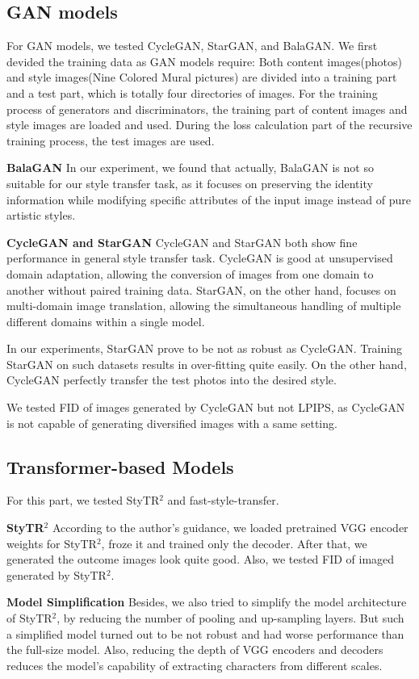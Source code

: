 \documentclass[conference]{IEEEtran}
\begin{document}
\subsection{GAN models}
For GAN models, we tested CycleGAN, StarGAN, and BalaGAN. We first devided the training data as GAN models require: Both content images(photos) and style images(Nine Colored Mural pictures) are divided into a training part and a test part, which is totally four directories of images. For the training process of generators and discriminators, the training part of content images and style images are loaded and used. During the loss calculation part of the recursive training process, the test images are used.

\textbf{BalaGAN} In our experiment, we found that actually, BalaGAN is not so suitable for our style transfer task, as it focuses on preserving the identity information while modifying specific attributes of the input image instead of pure artistic styles.

\textbf{CycleGAN and StarGAN} CycleGAN and StarGAN both show fine performance in general style transfer task. CycleGAN is good at unsupervised domain adaptation, allowing the conversion of images from one domain to another without paired training data. StarGAN, on the other hand, focuses on multi-domain image translation, allowing the simultaneous handling of multiple different domains within a single model. 

In our experiments, StarGAN prove to be not as robust as CycleGAN. Training StarGAN on such datasets results in over-fitting quite easily. On the other hand, CycleGAN perfectly transfer the test photos into the desired style.

We tested FID of images generated by CycleGAN but not LPIPS, as CycleGAN is not capable of generating diversified images with a same setting.

\subsection{Transformer-based Models}
For this part, we tested StyTR$^2$ and fast-style-transfer. 

\textbf{StyTR$^2$} According to the author's guidance, we loaded pretrained VGG encoder weights for StyTR$^2$, froze it and trained only the decoder. After that, we generated the outcome images look quite good. Also, we tested FID of imaged generated by StyTR$^2$.

\textbf{Model Simplification} Besides, we also tried to simplify the model architecture of StyTR$^2$, by reducing the number of pooling and up-sampling layers. But such a simplified model turned out to be not robust and had worse performance than the full-size model. Also, reducing the depth of VGG encoders and decoders reduces the model's capability of extracting characters from different scales.
\end{document}
